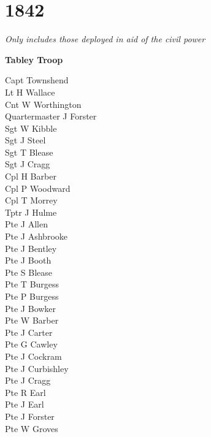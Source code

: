 \chapter*{1842}

\vspace*{10mm}

\begin{center}
  \textit{Only includes those deployed in aid of the civil power}
\end{center}

\vspace*{10mm}

\begin{center}
  \Large
  \textbf{Tabley Troop}
\end{center}

\begin{multicols}{3}
  \small
  \noindent
  Capt Townshend \\
  Lt H Wallace \\
  Cnt W Worthington \\
  Quartermaster J Forster \\
  Sgt W Kibble \\
  Sgt J Steel \\
  Sgt T Blease \\
  Sgt J Cragg \\
  Cpl H Barber \\
  Cpl P Woodward \\
  Cpl T Morrey \\
  Tptr J Hulme \\
  Pte J Allen \\
  Pte J Ashbrooke \\
  Pte J Bentley \\
  Pte J Booth \\
  Pte S Blease \\
  Pte T Burgess \\
  Pte P Burgess \\
  Pte J Bowker \\
  Pte W Barber \\
  Pte J Carter \\
  Pte G Cawley \\
  Pte J Cockram \\
  Pte J Curbishley \\
  Pte J Cragg \\
  Pte R Earl \\
  Pte J Earl \\
  Pte J Forster \\
  Pte W Groves \\

\end{multicols}
